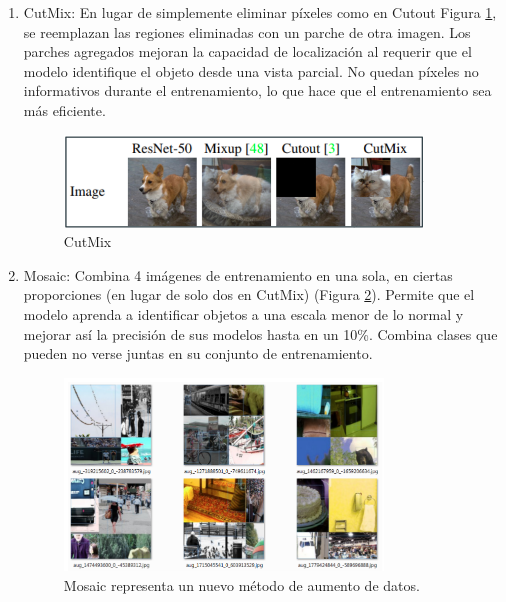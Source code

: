 \begin{enumerate}
    \item {CutMix:}
    En lugar de simplemente eliminar píxeles como en Cutout Figura \ref{fig:cutmix}, se reemplazan las regiones eliminadas con un parche de otra imagen.
    Los parches agregados mejoran la capacidad de localización al requerir que el modelo identifique el objeto desde una vista parcial.
    No quedan píxeles no informativos durante el entrenamiento, lo que hace que el entrenamiento sea más eficiente.

    \begin{figure}[h!]
        \centering
        \includegraphics[width=0.9\textwidth]{img/cutMix.png}
        \caption{CutMix}
        \label{fig:cutmix}
    \end{figure}

    \item{Mosaic:}
    Combina 4 imágenes de entrenamiento en una sola, en ciertas proporciones (en lugar de solo dos en CutMix) (Figura \ref{fig:mosaic}).
    Permite que el modelo aprenda a identificar objetos a una escala menor de lo normal y mejorar así la precisión de sus modelos hasta en un 10\%. Combina clases que pueden no verse juntas en su conjunto de entrenamiento.
    
    \begin{figure}[h!]
        \centering
        \includegraphics[width=0.8\textwidth]{img/mosaic.png}
        \caption{Mosaic representa un nuevo método de aumento de datos. \cite{yolov4}}
        \label{fig:mosaic}
    \end{figure}
    

\end{enumerate}
